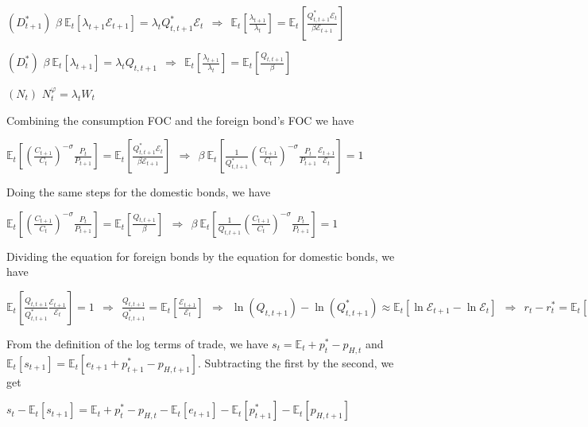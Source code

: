 \documentclass[
]{article}
\begin{document}
\((D_{t+1}^*)\)
\(\beta \ \mathbb{E}_t[\lambda_{t+1} \mathcal{E}_{t+1}] = \lambda_t Q_{t,t+1}^* \mathcal{E}_t \ \ \Rightarrow \ \ \displaystyle \mathbb{E}_t\left[ \frac{\lambda_{t+1}}{\lambda_t}\right] = \mathbb{E}_t\left[ \frac{Q_{t,t+1}^*\mathcal{E}_t}{\beta \mathcal{E}_{t+1}}\right]\)

\((D_{t}^*)\)
\(\beta \ \mathbb{E}_t[\lambda_{t+1} ] = \lambda_t Q_{t,t+1}\ \ \Rightarrow \ \ \displaystyle \mathbb{E}_t\left[ \frac{\lambda_{t+1}}{\lambda_t}\right] = \mathbb{E}_t\left[ \frac{Q_{t,t+1}}{\beta }\right]\)

\((N_t)\) \(N_t^\varphi=\lambda_t W_t\)

Combining the consumption FOC and the foreign bond's FOC we have

\(\displaystyle \mathbb{E}_t\left[ \left( \frac{C_{t+1}}{C_t} \right)^{-\sigma}\frac{P_t}{P_{t+1}}\right] = \mathbb{E}_t\left[ \frac{Q_{t,t+1}^*\mathcal{E}_t}{\beta \mathcal{E}_{t+1}}\right] \ \ \Rightarrow \ \ \beta \  \displaystyle \mathbb{E}_t\left[ \frac{1}{Q_{t,t+1}^*} \left( \frac{C_{t+1}}{C_t} \right)^{-\sigma}\frac{P_t}{P_{t+1}} \frac{\mathcal{E}_{t+1}}{\mathcal{E}_{t}} \right]=1\)

Doing the same steps for the domestic bonds, we have

\(\displaystyle \mathbb{E}_t\left[ \left( \frac{C_{t+1}}{C_t} \right)^{-\sigma}\frac{P_t}{P_{t+1}}\right] = \mathbb{E}_t\left[ \frac{Q_{t,t+1}}{\beta }\right] \ \ \Rightarrow \ \ \beta \  \displaystyle \mathbb{E}_t\left[ \frac{1}{Q_{t,t+1}} \left( \frac{C_{t+1}}{C_t} \right)^{-\sigma}\frac{P_t}{P_{t+1}} \right]=1\)

Dividing the equation for foreign bonds by the equation for domestic
bonds, we have

\(\displaystyle \mathbb{E}_t \left[ \frac{Q_{t,t+1}}{Q_{t,t+1}^*} \frac{\mathcal{E}_{t+1}}{\mathcal{E}_{t}} \right]=1 \ \ \Rightarrow \ \ \frac{Q_{t,t+1}}{Q_{t,t+1}^*} = \mathbb{E}_t \left[ \frac{\mathcal{E}_{t+1}}{\mathcal{E}_{t}} \right] \ \ \Rightarrow \ \ \ln(Q_{t,t+1})-\ln(Q_{t,t+1}^*) \approx \mathbb{E}_t[\ln{\mathcal{E}_{t+1} }-\ln \mathcal{E}_{t}] \ \ \Rightarrow \ \ r_t-r_t^*=\mathbb{E}_t[\Delta e_{t+1}]\)

From the definition of the log terms of trade, we have
\(s_t = \mathbb{E}_t + p_t^* - p_{H,t}\) and
\(\mathbb{E}_t[s_{t+1}] = \mathbb{E}_t[e_{t+1} + p_{t+1}^* - p_{H,t+1}]\).
Subtracting the first by the second, we get

\(s_t - \mathbb{E}_t[s_{t+1}] = \mathbb{E}_t + p_t^* - p_{H,t} - \mathbb{E}_t[e_{t+1}] - \mathbb{E}_t[p_{t+1}^*] - \mathbb{E}_t[p_{H,t+1}]\)
\end{document}

